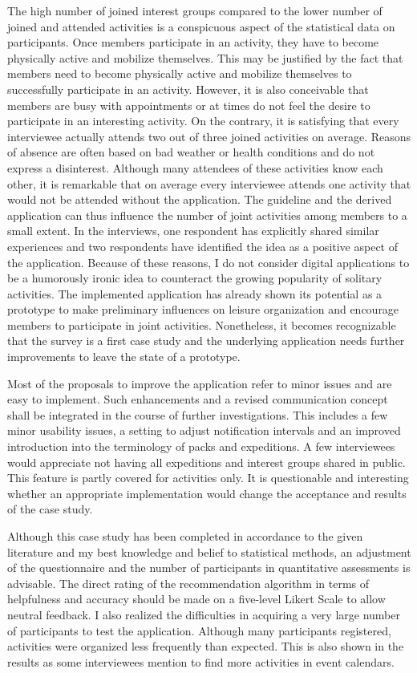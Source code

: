 \documentclass[12pt,numbers=noenddot,parskip,bibliography=totocnumbered,listof=totocnumbered,draft]{scrreprt}
\begin{document}
The high number of joined interest groups compared to the lower number of joined and attended activities is a conspicuous aspect of the statistical data on participants. Once members participate in an activity, they have to become physically active and mobilize themselves. This may be justified by the fact that members need to become physically active and mobilize themselves to successfully participate in an activity. However, it is also conceivable that members are busy with appointments or at times do not feel the desire to participate in an interesting activity. On the contrary, it is satisfying that every interviewee actually attends two out of three joined activities on average. Reasons of absence are often based on bad weather or health conditions and do not express a disinterest. Although many attendees of these activities know each other, it is remarkable that on average every interviewee attends one activity that would not be attended without the application. The guideline and the derived application can thus influence the number of joint activities among members to a small extent. In the interviews, one respondent has explicitly shared similar experiences and two respondents have identified the idea as a positive aspect of the application. Because of these reasons, I do not consider digital applications to be a humorously ironic idea to counteract the growing popularity of solitary activities. The implemented application has already shown its potential as a prototype to make preliminary influences on leisure organization and encourage members to participate in joint activities. Nonetheless, it becomes recognizable that the survey is a first case study and the underlying application needs further improvements to leave the state of a prototype. 

Most of the proposals to improve the application refer to minor issues and are easy to implement. Such enhancements and a revised communication concept shall be integrated in the course of further investigations. This includes a few minor usability issues, a setting to adjust notification intervals and an improved introduction into the terminology of packs and expeditions. A few interviewees would appreciate not having all expeditions and interest groups shared in public. This feature is partly covered for activities only. It is questionable and interesting whether an appropriate implementation would change the acceptance and results of the case study.

Although this case study has been completed in accordance to the given literature and my best knowledge and belief to statistical methods, an adjustment of the questionnaire and the number of participants in quantitative assessments is advisable. The direct rating of the recommendation algorithm in terms of helpfulness and accuracy should be made on a five-level Likert Scale \citep[p.25]{likert1932} to allow neutral feedback. I also realized the difficulties in acquiring a very large number of participants to test the application. Although many participants registered, activities were organized less frequently than expected. This is also shown in the results as some interviewees mention to find more activities in event calendars.
\end{document}
